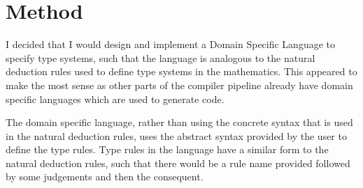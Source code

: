\chapter{Method}
I decided that I would design and implement a Domain Specific Language to specify type systems, such that the language is analogous to the natural deduction rules used to define type systems in the mathematics.
This appeared to make the most sense as other parts of the compiler pipeline already have domain specific languages which are used to generate code.

The domain specific language, rather than using the concrete syntax that is used in the natural deduction rules, uses the abstract syntax provided by the user to define the type rules.
Type rules in the language have a similar form to the natural deduction rules, such that there would be a rule name provided followed by some judgements and then the consequent.